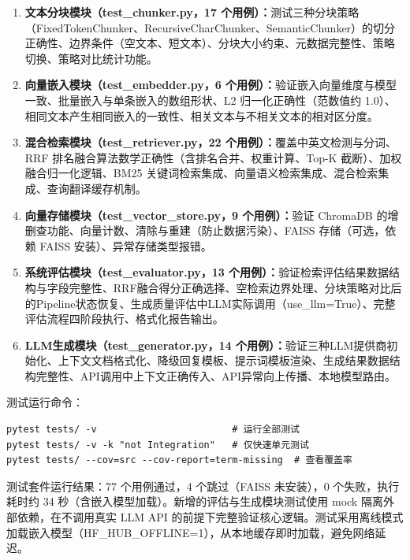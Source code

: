 \documentclass[10pt,a4paper]{article}
\begin{document}
\begin{enumerate}[label=(\arabic*)]
\item \textbf{文本分块模块（test\_chunker.py，17 个用例）：}测试三种分块策略（FixedTokenChunker、RecursiveCharChunker、SemanticChunker）的切分正确性、边界条件（空文本、短文本）、分块大小约束、元数据完整性、策略切换、策略对比统计功能。
\item \textbf{向量嵌入模块（test\_embedder.py，6 个用例）：}验证嵌入向量维度与模型一致、批量嵌入与单条嵌入的数组形状、L2 归一化正确性（范数值约 1.0）、相同文本产生相同嵌入的一致性、相关文本与不相关文本的相对区分度。
\item \textbf{混合检索模块（test\_retriever.py，22 个用例）：}覆盖中英文检测与分词、RRF 排名融合算法数学正确性（含排名合并、权重计算、Top-K 截断）、加权融合归一化逻辑、BM25 关键词检索集成、向量语义检索集成、混合检索集成、查询翻译缓存机制。
\item \textbf{向量存储模块（test\_vector\_store.py，9 个用例）：}验证 ChromaDB 的增删查功能、向量计数、清除与重建（防止数据污染）、FAISS 存储（可选，依赖 FAISS 安装）、异常存储类型报错。
\item \textbf{系统评估模块（test\_evaluator.py，13 个用例）：}验证检索评估结果数据结构与字段完整性、RRF融合得分正确选择、空检索边界处理、分块策略对比后的Pipeline状态恢复、生成质量评估中LLM实际调用（use\_llm=True）、完整评估流程四阶段执行、格式化报告输出。
\item \textbf{LLM生成模块（test\_generator.py，14 个用例）：}验证三种LLM提供商初始化、上下文文档格式化、降级回复模板、提示词模板渲染、生成结果数据结构完整性、API调用中上下文正确传入、API异常向上传播、本地模型路由。
\end{enumerate}

测试运行命令：

\begin{verbatim}
pytest tests/ -v                        # 运行全部测试
pytest tests/ -v -k "not Integration"   # 仅快速单元测试
pytest tests/ --cov=src --cov-report=term-missing  # 查看覆盖率
\end{verbatim}

测试套件运行结果：77 个用例通过，4 个跳过（FAISS 未安装），0 个失败，执行耗时约 34 秒（含嵌入模型加载）。新增的评估与生成模块测试使用 mock 隔离外部依赖，在不调用真实 LLM API 的前提下完整验证核心逻辑。测试采用离线模式加载嵌入模型（HF\_HUB\_OFFLINE=1），从本地缓存即时加载，避免网络延迟。

\end{document}
